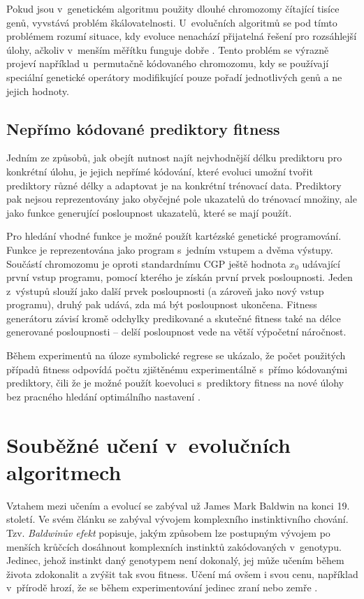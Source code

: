 Pokud jsou v~genetickém algoritmu použity dlouhé chromozomy čítající tisíce genů, vyvstává problém škálovatelnosti. U~evolučních algoritmů se pod tímto problémem rozumí situace, kdy evoluce nenachází přijatelná řešení pro rozsáhlejší úlohy, ačkoliv v~menším měřítku funguje dobře \cite{SikuKomjathy}. Tento problém se výrazně projeví například u~permutačně kódovaného chromozomu, kdy se používají speciální genetické operátory modifikující pouze pořadí jednotlivých genů a ne jejich hodnoty.

\subsection{Nepřímo kódované prediktory fitness}

Jedním ze způsobů, jak obejít nutnost najít nejvhodnější délku prediktoru pro konkrétní úlohu, je jejich nepřímé kódování, které evoluci umožní tvořit prediktory různé délky a adaptovat je na konkrétní trénovací data. Prediktory pak nejsou reprezentovány jako obyčejné pole ukazatelů do trénovací množiny, ale jako funkce generující posloupnost ukazatelů, které se mají použít.

Pro hledání vhodné funkce je možné použít kartézské genetické programování. Funkce je reprezentována jako program s~jedním vstupem a dvěma výstupy. Součástí chromozomu je oproti standardnímu CGP ještě hodnota $x_0$ udávající první vstup programu, pomocí kterého je získán první prvek posloupnosti. Jeden z~výstupů slouží jako další prvek posloupnosti (a zároveň jako nový vstup programu), druhý pak udává, zda má být posloupnost ukončena. Fitness generátoru závisí kromě odchylky predikované a skutečné fitness také na délce generované posloupnosti -- delší posloupnost vede na větší výpočetní náročnost.

Během experimentů na úloze symbolické regrese se ukázalo, že počet použitých případů fitness odpovídá počtu zjištěnému experimentálně s~přímo kódovanými prediktory, čili že je možné použít koevoluci s~prediktory fitness na nové úlohy bez pracného hledání optimálního nastavení \cite{Siku2015}.


\section{Souběžné učení v~evolučních algoritmech}

Vztahem mezi učením a evolucí se zabýval už James Mark Baldwin na konci 19. století. Ve svém článku \cite{Baldwin} se zabýval vývojem komplexního instinktivního chování. Tzv. \emph{Baldwinův efekt} popisuje, jakým způsobem lze postupným vývojem po menších krůčcích dosáhnout komplexních instinktů zakódovaných v~genotypu. Jedinec, jehož instinkt daný genotypem není dokonalý, jej může učením během života zdokonalit a zvýšit tak svou fitness. Učení má ovšem i svou cenu, například v~přírodě hrozí, že se během experimentování jedinec zraní nebo zemře \cite{HowToShiftBias}.

